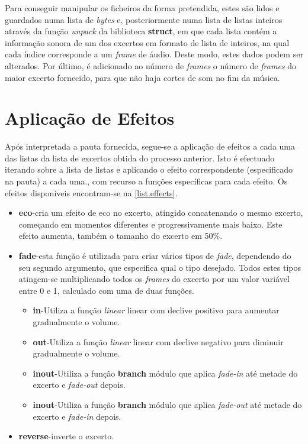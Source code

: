 \documentclass{report}
\begin{document}
Para conseguir manipular os ficheiros da forma pretendida, estes são lidos e guardados numa lista de \textit{bytes} e, posteriormente numa lista de listas inteiros através da função \textit{unpack} da biblioteca \textbf{struct}, em que cada lista contém a informação sonora de um dos excertos em formato de lista de inteiros, na qual cada índice corresponde a um \textit{frame} de áudio. Deste modo, estes dados podem ser alterados. Por último, é adicionado ao número de \textit{frames} o número de \textit{frames} do maior excerto fornecido, para que não haja cortes de som no fim da música.

\section{Aplicação de Efeitos}
\label{sec.efeitos}

Após interpretada a pauta fornecida, segue-se a aplicação de efeitos a cada uma das listas da lista de excertos obtida do processo anterior. Isto é efectuado iterando sobre a lista de listas e aplicando o efeito correspondente (especificado na pauta) a cada uma., com recurso a funções específicas para cada efeito.
Os efeitos disponíveis encontram-se na \autoref{list.effects}.

\begin{itemize}
	\item \textbf{eco}-cria um efeito de eco no excerto, atingido concatenando o mesmo excerto, começando em momentos diferentes e progressivamente mais baixo. Este efeito aumenta, também o tamanho do excerto em 50\%.
	\item \textbf{fade}-esta função é utilizada para criar vários tipos de \textit{fade}, dependendo do seu segundo argumento, que especifica qual o tipo desejado. Todos estes tipos atingem-se multiplicando todos os \textit{frames} do excerto por um valor variável entre 0 e 1, calculado com uma de duas funções.
	      \begin{itemize}
		      \item \textbf{in}-Utiliza a função \textit{linear} linear com declive positivo para aumentar gradualmente o volume.
		      \item \textbf{out}-Utiliza a função \textit{linear} linear com declive negativo para diminuir gradualmente o volume.
		      \item \textbf{inout}-Utiliza a função \textbf{branch} módulo que aplica \textit{fade-in} até metade do excerto e \textit{fade-out} depois.
		      \item \textbf{inout}-Utiliza a função \textbf{branch} módulo que aplica \textit{fade-out} até metade do excerto e \textit{fade-in} depois.
	      \end{itemize}
	\item \textbf{reverse}-inverte o excerto.
	      \label{list.effects}
\end{itemize}
\end{document}
